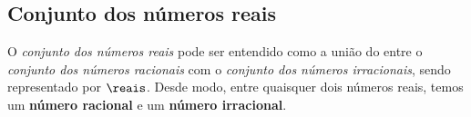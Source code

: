 \subsection{Conjunto dos números reais}

O \emph{conjunto dos números reais} pode ser entendido como a união do entre o \emph{conjunto dos números racionais} com o \emph{conjunto dos números irracionais}, sendo representado por $\reais$. Desde modo, entre quaisquer dois números reais, temos um \textbf{número racional} e um \textbf{número irracional}.